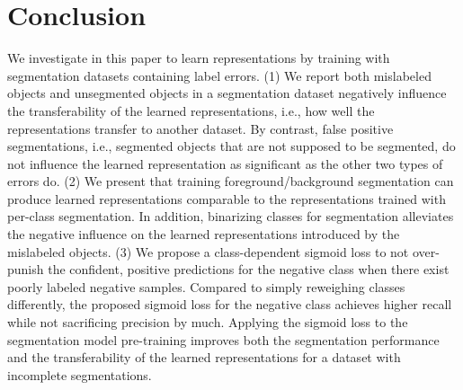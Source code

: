 \section{Conclusion}
\label{sec:conclusion}

We investigate in this paper to learn representations by training with segmentation datasets containing label errors.
(1) We report both mislabeled objects and unsegmented objects in a segmentation dataset negatively influence the transferability of the learned representations, i.e., how well the representations transfer to another dataset.
By contrast, false positive segmentations, i.e., segmented objects that are not supposed to be segmented, do not influence the learned representation as significant as the other two types of errors do.
(2) We present that training foreground/background segmentation can produce learned representations comparable to the representations trained with per-class segmentation.
In addition, binarizing classes for segmentation alleviates the negative influence on the learned representations introduced by the mislabeled objects.
(3) We propose a class-dependent sigmoid loss to not over-punish the confident, positive predictions for the negative class when there exist poorly labeled negative samples.
Compared to simply reweighing classes differently, the proposed sigmoid loss for the negative class achieves higher recall while not sacrificing precision by much.
Applying the sigmoid loss to the segmentation model pre-training improves both the segmentation performance and the transferability of the learned representations for a dataset with incomplete segmentations.
